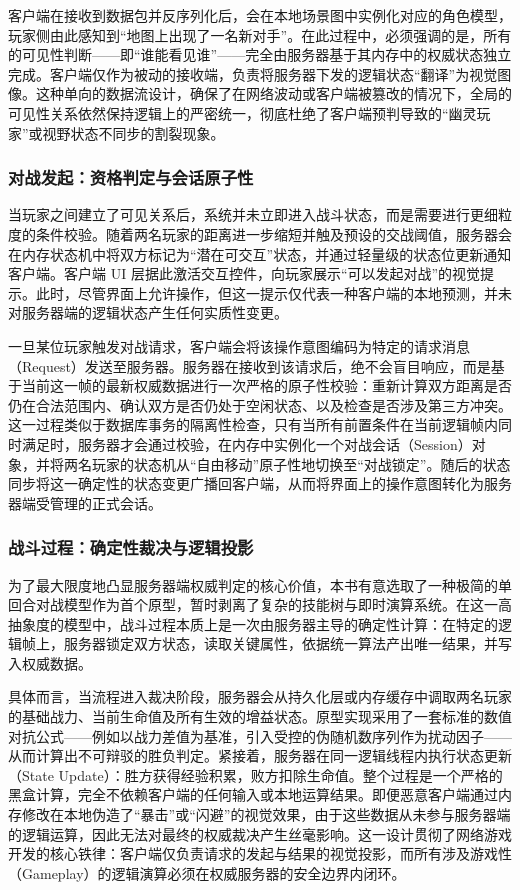 客户端在接收到数据包并反序列化后，会在本地场景图中实例化对应的角色模型，玩家侧由此感知到“地图上出现了一名新对手”。在此过程中，必须强调的是，所有的可见性判断——即“谁能看见谁”——完全由服务器基于其内存中的权威状态独立完成。客户端仅作为被动的接收端，负责将服务器下发的逻辑状态“翻译”为视觉图像。这种单向的数据流设计，确保了在网络波动或客户端被篡改的情况下，全局的可见性关系依然保持逻辑上的严密统一，彻底杜绝了客户端预判导致的“幽灵玩家”或视野状态不同步的割裂现象。

\subsubsection{对战发起：资格判定与会话原子性}

当玩家之间建立了可见关系后，系统并未立即进入战斗状态，而是需要进行更细粒度的条件校验。随着两名玩家的距离进一步缩短并触及预设的交战阈值，服务器会在内存状态机中将双方标记为“潜在可交互”状态，并通过轻量级的状态位更新通知客户端。客户端 UI 层据此激活交互控件，向玩家展示“可以发起对战”的视觉提示。此时，尽管界面上允许操作，但这一提示仅代表一种客户端的本地预测，并未对服务器端的逻辑状态产生任何实质性变更。

一旦某位玩家触发对战请求，客户端会将该操作意图编码为特定的请求消息（Request）发送至服务器。服务器在接收到该请求后，绝不会盲目响应，而是基于当前这一帧的最新权威数据进行一次严格的原子性校验：重新计算双方距离是否仍在合法范围内、确认双方是否仍处于空闲状态、以及检查是否涉及第三方冲突。这一过程类似于数据库事务的隔离性检查，只有当所有前置条件在当前逻辑帧内同时满足时，服务器才会通过校验，在内存中实例化一个对战会话（Session）对象，并将两名玩家的状态机从“自由移动”原子性地切换至“对战锁定”。随后的状态同步将这一确定性的状态变更广播回客户端，从而将界面上的操作意图转化为服务器端受管理的正式会话。

\subsubsection{战斗过程：确定性裁决与逻辑投影}

为了最大限度地凸显服务器端权威判定的核心价值，本书有意选取了一种极简的单回合对战模型作为首个原型，暂时剥离了复杂的技能树与即时演算系统。在这一高抽象度的模型中，战斗过程本质上是一次由服务器主导的确定性计算：在特定的逻辑帧上，服务器锁定双方状态，读取关键属性，依据统一算法产出唯一结果，并写入权威数据。

具体而言，当流程进入裁决阶段，服务器会从持久化层或内存缓存中调取两名玩家的基础战力、当前生命值及所有生效的增益状态。原型实现采用了一套标准的数值对抗公式——例如以战力差值为基准，引入受控的伪随机数序列作为扰动因子——从而计算出不可辩驳的胜负判定。紧接着，服务器在同一逻辑线程内执行状态更新（State Update）：胜方获得经验积累，败方扣除生命值。整个过程是一个严格的黑盒计算，完全不依赖客户端的任何输入或本地运算结果。即便恶意客户端通过内存修改在本地伪造了“暴击”或“闪避”的视觉效果，由于这些数据从未参与服务器端的逻辑运算，因此无法对最终的权威裁决产生丝毫影响。这一设计贯彻了网络游戏开发的核心铁律：客户端仅负责请求的发起与结果的视觉投影，而所有涉及游戏性（Gameplay）的逻辑演算必须在权威服务器的安全边界内闭环。

